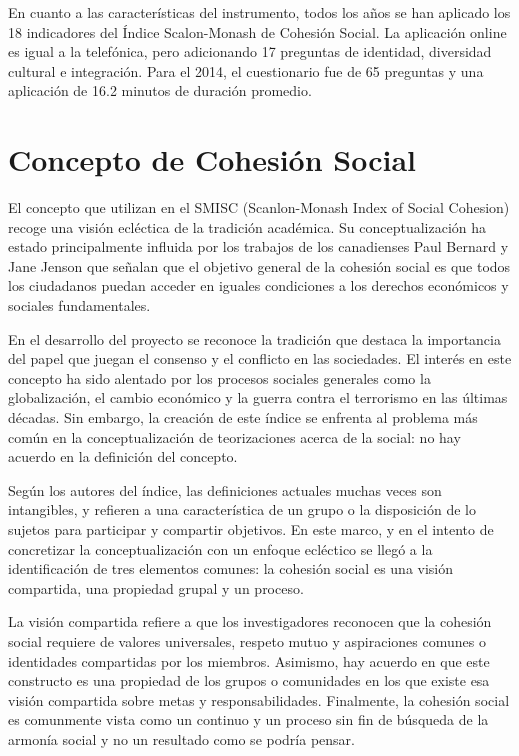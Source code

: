 \documentclass[
  12pt,
]{book}
\begin{document}
En cuanto a las características del instrumento, todos los años se han
aplicado los 18 indicadores del Índice Scalon-Monash de Cohesión Social.
La aplicación online es igual a la telefónica, pero adicionando 17
preguntas de identidad, diversidad cultural e integración. Para el 2014,
el cuestionario fue de 65 preguntas y una aplicación de 16.2 minutos de
duración promedio.

\hypertarget{concepto-de-cohesiuxf3n-social-1}{%
\section{Concepto de Cohesión Social}\label{concepto-de-cohesiuxf3n-social-1}}

El concepto que utilizan en el SMISC (Scanlon-Monash Index of Social
Cohesion) recoge una visión ecléctica de la tradición académica. Su
conceptualización ha estado principalmente influida por los trabajos de
los canadienses Paul Bernard y Jane Jenson que señalan que el objetivo
general de la cohesión social es que todos los ciudadanos puedan acceder
en iguales condiciones a los derechos económicos y sociales
fundamentales.

En el desarrollo del proyecto se reconoce la tradición que destaca la
importancia del papel que juegan el consenso y el conflicto en las
sociedades. El interés en este concepto ha sido alentado por los
procesos sociales generales como la globalización, el cambio económico y
la guerra contra el terrorismo en las últimas décadas. Sin embargo, la
creación de este índice se enfrenta al problema más común en la
conceptualización de teorizaciones acerca de la social: no hay acuerdo
en la definición del concepto.

Según los autores del índice, las definiciones actuales muchas veces son
intangibles, y refieren a una característica de un grupo o la
disposición de lo sujetos para participar y compartir objetivos. En este
marco, y en el intento de concretizar la conceptualización con un
enfoque ecléctico se llegó a la identificación de tres elementos
comunes: la cohesión social es una visión compartida, una propiedad
grupal y un proceso.

La visión compartida refiere a que los investigadores reconocen que la
cohesión social requiere de valores universales, respeto mutuo y
aspiraciones comunes o identidades compartidas por los miembros.
Asimismo, hay acuerdo en que este constructo es una propiedad de los
grupos o comunidades en los que existe esa visión compartida sobre metas
y responsabilidades. Finalmente, la cohesión social es comunmente vista
como un continuo y un proceso sin fin de búsqueda de la armonía social y
no un resultado como se podría pensar.
\end{document}
